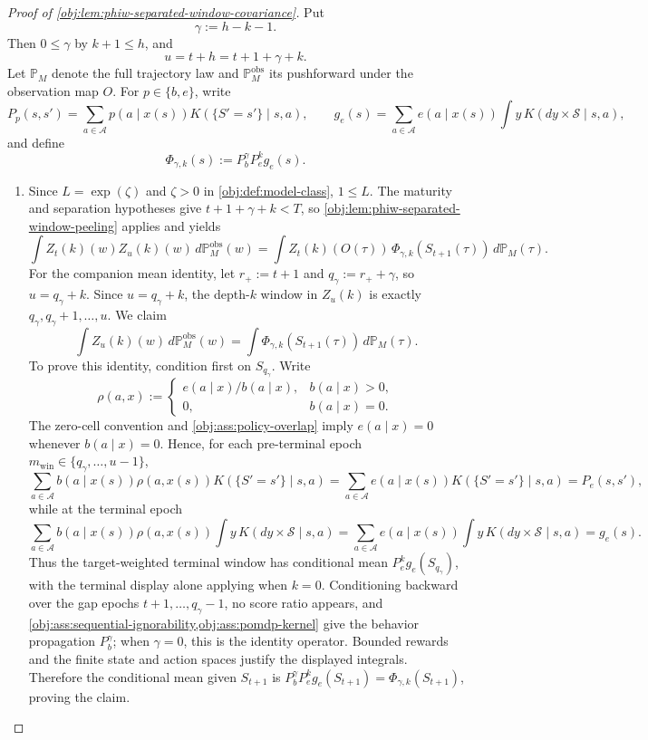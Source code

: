 \begin{proof}[Proof of \cref{obj:lem:phiw-separated-window-covariance}]
Put
\[
\gamma:=h-k-1 .
\]
Then \(0\le \gamma\) by \(k+1\le h\), and
\[
u=t+h=t+1+\gamma+k .
\]
Let \(\mathbb P_M\) denote the full trajectory law and \(\mathbb P_M^{\mathrm{obs}}\) its pushforward under the observation map \(O\). For \(p\in\{b,e\}\), write
\[
P_p(s,s')=\sum_{a\in\mathcal A}p(a\mid x(s))K(\{S'=s'\}\mid s,a),
\qquad
g_e(s)=\sum_{a\in\mathcal A}e(a\mid x(s))\int y\,K(dy\times\mathcal S\mid s,a),
\]
and define
\[
\Phi_{\gamma,k}(s):=P_b^\gamma P_e^k g_e(s).
\]

\begin{enumerate}
\item Since \(L=\exp(\zeta)\) and \(\zeta>0\) in \cref{obj:def:model-class}, \(1\le L\). The maturity and separation hypotheses give \(t+1+\gamma+k<T\), so \cref{obj:lem:phiw-separated-window-peeling} applies and yields
\[
\int Z_t(k)(w)Z_u(k)(w)\,d\mathbb P_M^{\mathrm{obs}}(w)
=
\int Z_t(k)(O(\tau))\,\Phi_{\gamma,k}(S_{t+1}(\tau))\,d\mathbb P_M(\tau).
\]
For the companion mean identity, let \(r_{+}:=t+1\) and \(q_{\gamma}:=r_{+}+\gamma\), so \(u=q_{\gamma}+k\). Since \(u=q_{\gamma}+k\), the depth-\(k\) window in \(Z_u(k)\) is exactly \(q_{\gamma},q_{\gamma}+1,\ldots,u\). We claim
\[
\int Z_u(k)(w)\,d\mathbb P_M^{\mathrm{obs}}(w)
=
\int \Phi_{\gamma,k}(S_{t+1}(\tau))\,d\mathbb P_M(\tau).
\]
To prove this identity, condition first on \(S_{q_{\gamma}}\). Write
\[
\rho(a,x):=
\begin{cases}
 e(a\mid x)/b(a\mid x),& b(a\mid x)>0,\\
 0,& b(a\mid x)=0.
\end{cases}
\]
The zero-cell convention and \cref{obj:ass:policy-overlap} imply \(e(a\mid x)=0\) whenever \(b(a\mid x)=0\). Hence, for each pre-terminal epoch \(m_{\mathrm{win}}\in\{q_{\gamma},\ldots,u-1\}\),
\[
\sum_{a\in\mathcal A} b(a\mid x(s))\rho(a,x(s))
        K(\{S'=s'\}\mid s,a)
=
\sum_{a\in\mathcal A} e(a\mid x(s))K(\{S'=s'\}\mid s,a)
=P_e(s,s'),
\]
while at the terminal epoch
\[
\sum_{a\in\mathcal A} b(a\mid x(s))\rho(a,x(s))
        \int y\,K(dy\times\mathcal S\mid s,a)
=
\sum_{a\in\mathcal A} e(a\mid x(s))
        \int y\,K(dy\times\mathcal S\mid s,a)
=g_e(s).
\]
Thus the target-weighted terminal window has conditional mean \(P_e^k g_e(S_{q_{\gamma}})\), with the terminal display alone applying when \(k=0\). Conditioning backward over the gap epochs \(t+1,\ldots,q_{\gamma}-1\), no score ratio appears, and \cref{obj:ass:sequential-ignorability,obj:ass:pomdp-kernel} give the behavior propagation \(P_b^\gamma\); when \(\gamma=0\), this is the identity operator. Bounded rewards and the finite state and action spaces justify the displayed integrals. Therefore the conditional mean given \(S_{t+1}\) is \(P_b^\gamma P_e^k g_e(S_{t+1})=\Phi_{\gamma,k}(S_{t+1})\), proving the claim. %

\end{enumerate}
\end{proof}
